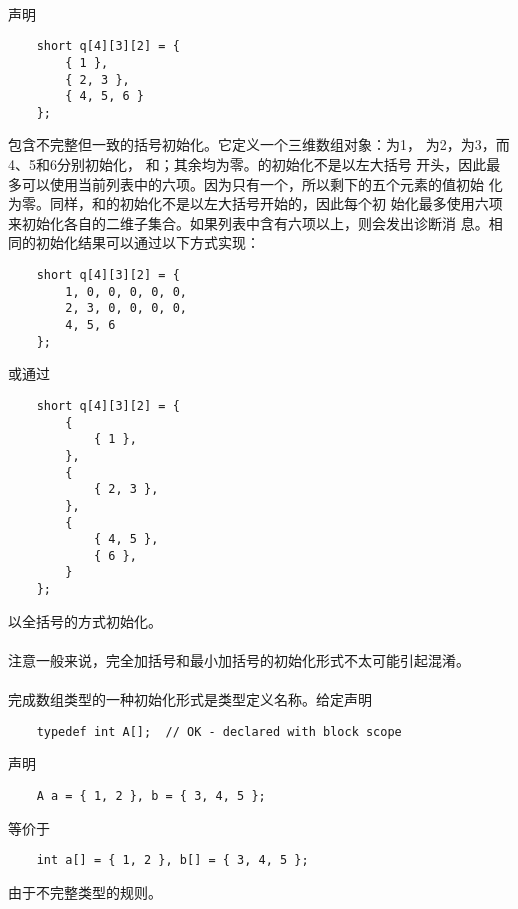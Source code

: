 \paragraph{}
\ex 声明
\begin{lstlisting}
    short q[4][3][2] = {
        { 1 },
        { 2, 3 },
        { 4, 5, 6 }
    };
\end{lstlisting}
包含不完整但一致的括号初始化。它定义一个三维数组对象：为1，
为2，为3，而4、5和6分别初始化，
和；其余均为零。的初始化不是以左大括号
开头，因此最多可以使用当前列表中的六项。因为只有一个，所以剩下的五个元素的值初始
化为零。同样，和的初始化不是以左大括号开始的，因此每个初
始化最多使用六项来初始化各自的二维子集合。如果列表中含有六项以上，则会发出诊断消
息。相同的初始化结果可以通过以下方式实现：
\begin{lstlisting}
    short q[4][3][2] = {
        1, 0, 0, 0, 0, 0,
        2, 3, 0, 0, 0, 0,
        4, 5, 6
    };
\end{lstlisting}
或通过
\begin{lstlisting}
    short q[4][3][2] = {
        {
            { 1 },
        },
        {
            { 2, 3 },
        },
        {
            { 4, 5 },
            { 6 },
        }
    };
\end{lstlisting}
以全括号的方式初始化。

\paragraph{}
注意一般来说，完全加括号和最小加括号的初始化形式不太可能引起混淆。

\paragraph{}
\ex 完成数组类型的一种初始化形式是类型定义名称。给定声明
\begin{lstlisting}
    typedef int A[];  // OK - declared with block scope
\end{lstlisting}
声明
\begin{lstlisting}
    A a = { 1, 2 }, b = { 3, 4, 5 };
\end{lstlisting}
等价于
\begin{lstlisting}
    int a[] = { 1, 2 }, b[] = { 3, 4, 5 };
\end{lstlisting}
由于不完整类型的规则。

